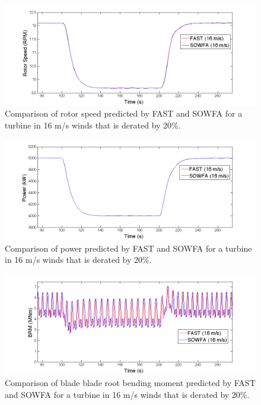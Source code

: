 \begin{figure}[ht]
	\centering
	\includegraphics[width = .95\linewidth]{Figures/ch6Figures/fig6-2.png}		
	\caption{Comparison of rotor speed predicted by FAST and SOWFA for a turbine in 16 m/s winds that is derated by 20\%. }
		\label{fig6-2}
\end{figure}

\begin{figure}[ht]	
	\centering
		\includegraphics[width = .95\linewidth]{Figures/ch6Figures/fig6-3.png}
	\caption{Comparison of power predicted by FAST and SOWFA for a turbine in 16 m/s winds that is derated by 20\%.}
	\label{fig6-3}
\end{figure}

\begin{figure}[ht]	
	\centering
		\includegraphics[width = .95\linewidth]{Figures/ch6Figures/fig6-5.png}

	\caption{Comparison of blade blade root bending moment predicted by FAST and SOWFA for a turbine in 16 m/s winds that is derated by 20\%.}
	\label{fig6-5}
\end{figure}

